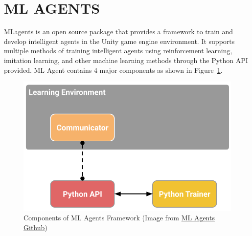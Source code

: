 


\section{ML AGENTS}
MLagents is an open source package that provides a framework to train
and develop intelligent agents in the Unity game engine
environment. It supports multiple methods of training intelligent
agents using reinforcement learning, imitation learning, and other
machine learning methods through the Python API provided. ML Agent
contains 4 major components as shown in Figure~\ref{fig:mlagents}.
%
\begin{figure}[H]
  \centering
  \includegraphics[width=1.0\textwidth]{images/mlagents.png}
  \caption{Components of ML Agents Framework (Image from
    \href{https://github.com/Unity-Technologies/ml-agents}{ML Agents
      Github})}
  \label{fig:mlagents}
\end{figure}

